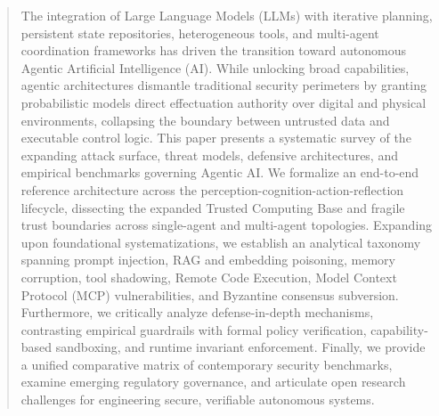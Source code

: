 \begin{abstract}
The integration of Large Language Models (LLMs) with iterative planning, persistent state repositories, heterogeneous tools, and multi-agent coordination frameworks has driven the transition toward autonomous Agentic Artificial Intelligence (AI). While unlocking broad capabilities, agentic architectures dismantle traditional security perimeters by granting probabilistic models direct effectuation authority over digital and physical environments, collapsing the boundary between untrusted data and executable control logic. This paper presents a systematic survey of the expanding attack surface, threat models, defensive architectures, and empirical benchmarks governing Agentic AI. We formalize an end-to-end reference architecture across the perception-cognition-action-reflection lifecycle, dissecting the expanded Trusted Computing Base and fragile trust boundaries across single-agent and multi-agent topologies. Expanding upon foundational systematizations, we establish an analytical taxonomy spanning prompt injection, RAG and embedding poisoning, memory corruption, tool shadowing, Remote Code Execution, Model Context Protocol (MCP) vulnerabilities, and Byzantine consensus subversion. Furthermore, we critically analyze defense-in-depth mechanisms, contrasting empirical guardrails with formal policy verification, capability-based sandboxing, and runtime invariant enforcement. Finally, we provide a unified comparative matrix of contemporary security benchmarks, examine emerging regulatory governance, and articulate open research challenges for engineering secure, verifiable autonomous systems.
\end{abstract}
